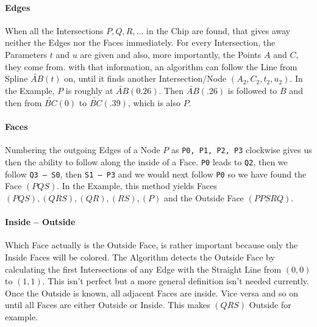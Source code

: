 \paragraph{Edges}
    When all the Intersections $P, Q, R, ...$ in the Chip are found, that gives away neither the Edges nor the Faces immediately. For every Intersection, the Parameters $t$ and $u$ are given and also, more importantly, the Points $A$ and $C$, they come from. with that information, an algorithm can follow the Line from Spline $\widetilde{AB}(t)$ on, until it finds another Intersection/Node $(A_2, C_2, t_2, u_2)$.
    In the Example, $P$ is roughly at $\widetilde{AB}(0.26)$. Then $\widetilde{AB}(.26)$ is followed to $B$ and then from $\widetilde{BC}(0)$ to $\widetilde{BC}(.39)$, which is also $P$.
\paragraph{Faces}
    Numbering the outgoing Edges of a Node $P$ as {\tt P0, P1, P2, P3} clockwise gives us then the ability to follow along the inside of a Face. {\tt P0} leads to {\tt Q2}, then we follow {\tt Q3 -- S0}, then {\tt S1 -- P3} and we would next follow {\tt P0} so we have found the Face $(PQS)$.
    In the Example, this method yields Faces $(PQS), (QRS), (QR), (RS), (P)$ and the Outside Face $(PPSRQ)$.
\paragraph{Inside – Outside}
    Which Face actually is the Outside Face, is rather important because only the Inside Faces will be colored. The Algorithm detects the Outside Face by calculating the first Intersections of any Edge with the Straight Line from $(0, 0)$ to $(1, 1)$. This isn't perfect but a more general definition isn't needed currently.
    Once the Outside is known, all adjacent Faces are inside. Vice versa and so on until all Faces are either Outside or Inside. This makes $(QRS)$ Outside for example.
